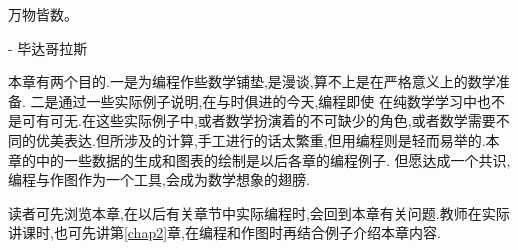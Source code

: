 \documentclass[main.tex]{subfiles}
\begin{document}
\begin{flushright}
	\begin{kaishu}
		万物皆数。\\
	\end{kaishu}
	- 毕达哥拉斯
\end{flushright}

本章有两个目的.一是为编程作些数学铺垫,是漫谈,算不上是在严格意义上的数学准备.
二是通过一些实际例子说明,在与时俱进的今天,编程即使
在纯数学学习中也不是可有可无.在这些实际例子中,或者数学扮演着的不可缺少的角色,或者数学需要不同的优美表达.但所涉及的计算,手工进行的话太繁重,但用编程则是轻而易举的.本章的中的一些数据的生成和图表的绘制是以后各章的编程例子.
但愿达成一个共识,编程与作图作为一个工具,会成为数学想象的翅膀.

读者可先浏览本章,在以后有关章节中实际编程时,会回到本章有关问题.教师在实际讲课时,也可先讲第\ref{chap2}章,在编程和作图时再结合例子介绍本章内容.
\end{document}
